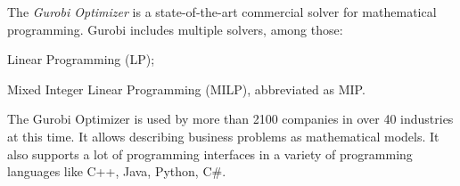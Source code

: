 \documentclass[../../thesis.tex]{subfiles}
\begin{document}
The \emph{Gurobi Optimizer} \cite{gurobi} is a state-of-the-art commercial solver for mathematical programming. 
Gurobi includes multiple solvers, among those:
\begin{enumerate*}[label=(\roman*)]
  \item Linear Programming (LP);
  \item Mixed Integer Linear Programming (MILP), abbreviated as MIP.
\end{enumerate*}


The Gurobi Optimizer is used by more than 2100 companies in over 40 industries at this time. It allows 
describing business problems as mathematical models. It also supports a lot of programming interfaces
in a variety of programming languages like C++, Java, Python, C\#.
\end{document}
